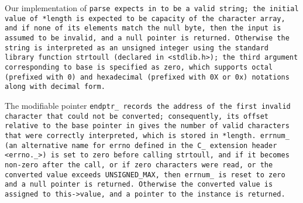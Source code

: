 Our implementation of \tt{parse} expects \tt{in} to be a valid string;
the initial value of \tt{*length} is expected to be capacity of the
character array, and if none of its elements match the null byte,
then the input is assumed to be invalid, and a null pointer is returned.
Otherwise the string is interpreted as an unsigned integer using the
standard library function \tt{strtoull} (declared in \tt{<stdlib.h>});
the third argument corresponding to base is specified as zero,
which supports octal (prefixed with \tt{0}) and hexadecimal
(prefixed with \tt{0X} or \tt{0x}) notations along with decimal form.

The modifiable pointer \tt{endptr_} records the address of the first
invalid character that could not be converted; consequently, its offset
relative to the base pointer \tt{in} gives the number of valid characters
that were correctly interpreted, which is stored in \tt{*length}.
\tt{errnum_} (an alternative name for \tt{errno} defined in the
C\_ extension header \tt{<errno._>}) is set to zero before calling
\tt{strtoull}, and if it becomes non-zero after the call, or if zero
characters were read, or the converted value exceeds \tt{UNSIGNED_MAX},
then \tt{errnum_} is reset to zero and a null pointer is returned.
Otherwise the converted value is assigned to \tt{this->value},
and a pointer to the instance is returned.
